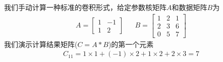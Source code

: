 \documentclass[12pt]{article}
\numberwithin{figure}{section}
\numberwithin{equation}{section}
\begin{document}
\begin{example}
我们手动计算一种标准的卷积形式，给定参数核矩阵$A$和数据矩阵$B$为
\begin{align*}
	A = \begin{bmatrix}
		1 & -1 \\
		1 & 2 
	\end{bmatrix} & & B= \begin{bmatrix}
		1 & 2 & 1 \\
		2 & 3 & 6 \\
		0 & 5 & 7 
	\end{bmatrix}
\end{align*}	
我们演示计算结果矩阵($C = A*B$)的第一个元素
\begin{align*}
	C_{11} = 1\times 1 + (-1) \times 2 + 1 \times 2 + 2 \times 3 = 7 
\end{align*}
\end{example}
\end{document}
